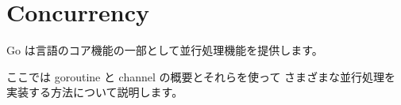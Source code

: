 \section{Concurrency}

Go は言語のコア機能の一部として並行処理機能を提供します。

ここでは goroutine と channel の概要とそれらを使って
さまざまな並行処理を実装する方法について説明します。

